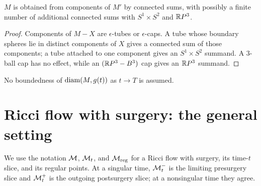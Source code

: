 \begin{lemma}
  \label{lem:kl-structure-at-first-singularity-time-structure-at-first-singularity-time-lemma-11}
 \label{reconstruct}
$M$ is obtained from components of $M'$ by connected sums, with possibly a
finite number of additional connected sums with $S^1\times S^2$ and ${\mathbb R} P^3$.
\end{lemma}
\begin{proof}
\sketch Components of $M-X$ are $\epsilon$-tubes or $\epsilon$-caps. A tube
whose boundary spheres lie in distinct components of $X$ gives a connected sum
of those components; a tube attached to one component gives an
$S^1\times S^2$ summand. A $3$-ball cap has no effect, while an
$({\mathbb R} P^3-B^3)$ cap gives an ${\mathbb R} P^3$ summand.
\end{proof}

\begin{remark}
  \label{rem:kl-structure-at-first-singularity-time-estimates-diameter}

No boundedness of $\operatorname{diam}(M,g(t))$ as $t\to T$ is assumed.
\end{remark}

\section{Ricci flow with surgery: the general setting}
\label{Ricci flow with surgery}

We use the notation ${\mathcal M}$, ${\mathcal M}_t$, and ${\mathcal M}_{\operatorname{reg}}$ for a Ricci flow with
surgery, its time-$t$ slice, and its regular points. At a singular time,
${\mathcal M}_t^-$ is the limiting presurgery slice and ${\mathcal M}_t^+$ is the outgoing
postsurgery slice; at a nonsingular time they agree.


